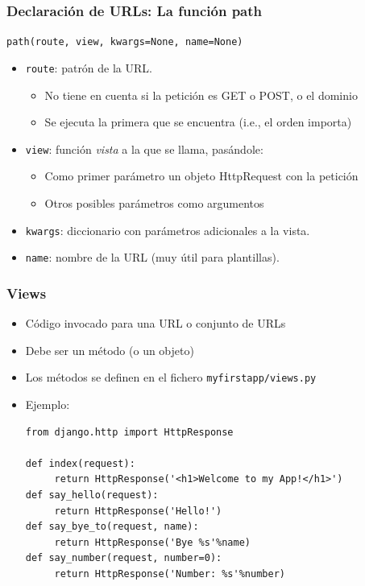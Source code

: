 \begin{frame}[fragile]
\frametitle{Declaración de URLs: La función path}

\verb|path(route, view, kwargs=None, name=None)|

\begin{itemize}
 \item \verb|route|: patrón de la URL.
 \begin{itemize}
   \item No tiene en cuenta si la petición es GET o POST, o el dominio
   \item Se ejecuta la primera que se encuentra (i.e., el orden importa)
 \end{itemize} 
 \item \verb|view|: función \emph{vista} a la que se llama, pasándole:
 \begin{itemize}
   \item Como primer parámetro un objeto HttpRequest con la petición
   \item Otros posibles parámetros como argumentos
 \end{itemize} 
 \item \verb|kwargs|: diccionario con parámetros adicionales a la vista.
 \item \verb|name|: nombre de la URL (muy útil para plantillas).
\end{itemize}

\end{frame}

\begin{frame}[fragile]
\frametitle{Views}

\begin{itemize}
\item Código invocado para una URL o conjunto de URLs
\item Debe ser un método (o un objeto)
\item Los métodos se definen en el fichero \verb|myfirstapp/views.py|
\item Ejemplo:
\begin{verbatim}
from django.http import HttpResponse

def index(request):
     return HttpResponse('<h1>Welcome to my App!</h1>')
def say_hello(request):
     return HttpResponse('Hello!')
def say_bye_to(request, name):
     return HttpResponse('Bye %s'%name)
def say_number(request, number=0):
     return HttpResponse('Number: %s'%number)
\end{verbatim}
\end{itemize}
\end{frame}



